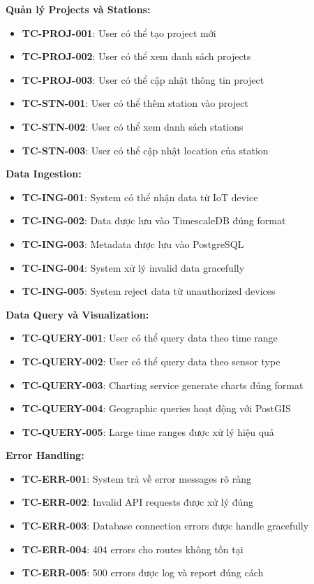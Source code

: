 \textbf{Quản lý Projects và Stations:}
\begin{itemize}
    \item \textbf{TC-PROJ-001}: User có thể tạo project mới
    \item \textbf{TC-PROJ-002}: User có thể xem danh sách projects
    \item \textbf{TC-PROJ-003}: User có thể cập nhật thông tin project
    \item \textbf{TC-STN-001}: User có thể thêm station vào project
    \item \textbf{TC-STN-002}: User có thể xem danh sách stations
    \item \textbf{TC-STN-003}: User có thể cập nhật location của station
\end{itemize}

\textbf{Data Ingestion:}
\begin{itemize}
    \item \textbf{TC-ING-001}: System có thể nhận data từ IoT device
    \item \textbf{TC-ING-002}: Data được lưu vào TimescaleDB đúng format
    \item \textbf{TC-ING-003}: Metadata được lưu vào PostgreSQL
    \item \textbf{TC-ING-004}: System xử lý invalid data gracefully
    \item \textbf{TC-ING-005}: System reject data từ unauthorized devices
\end{itemize}

\textbf{Data Query và Visualization:}
\begin{itemize}
    \item \textbf{TC-QUERY-001}: User có thể query data theo time range
    \item \textbf{TC-QUERY-002}: User có thể query data theo sensor type
    \item \textbf{TC-QUERY-003}: Charting service generate charts đúng format
    \item \textbf{TC-QUERY-004}: Geographic queries hoạt động với PostGIS
    \item \textbf{TC-QUERY-005}: Large time ranges được xử lý hiệu quả
\end{itemize}

\textbf{Error Handling:}
\begin{itemize}
    \item \textbf{TC-ERR-001}: System trả về error messages rõ ràng
    \item \textbf{TC-ERR-002}: Invalid API requests được xử lý đúng
    \item \textbf{TC-ERR-003}: Database connection errors được handle gracefully
    \item \textbf{TC-ERR-004}: 404 errors cho routes không tồn tại
    \item \textbf{TC-ERR-005}: 500 errors được log và report đúng cách
\end{itemize}

